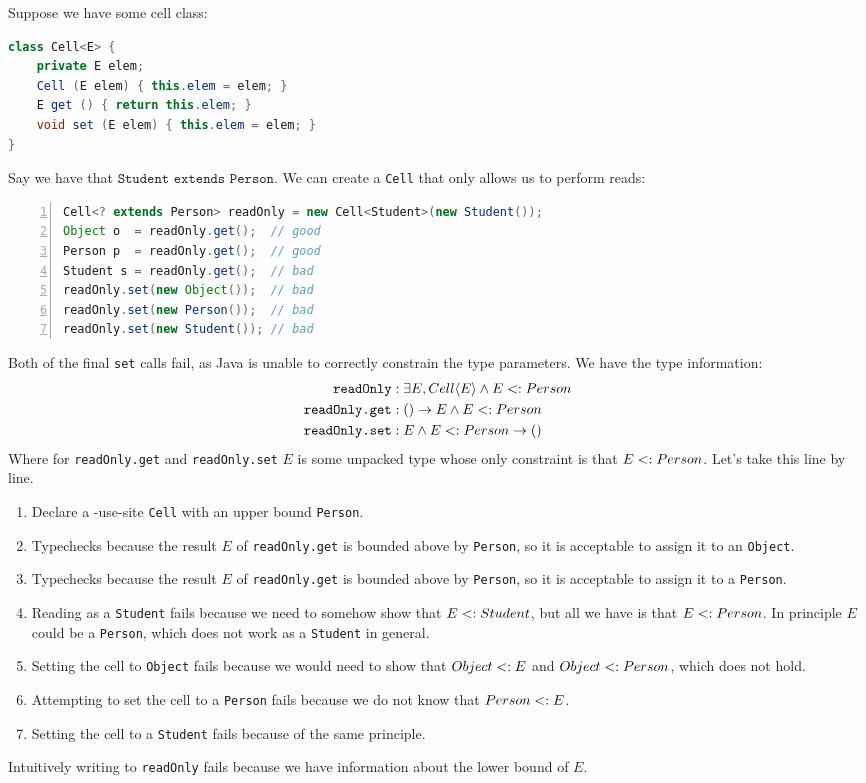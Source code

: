 \documentclass{article}
\begin{document}
\begin{example}
Suppose we have some cell class:
\begin{lstlisting}[escapechar=|, language=Java]
class Cell<E> {
    private E elem;
    Cell (E elem) { this.elem = elem; }
    E get () { return this.elem; }
    void set (E elem) { this.elem = elem; }
}
\end{lstlisting}
Say we have that $\texttt{Student extends Person}$.
We can create a \covar{} \texttt{Cell} that only allows us to perform reads:
\begin{lstlisting}[escapechar=|, language=Java, numbers=left]
Cell<? extends Person> readOnly = new Cell<Student>(new Student());
Object o  = readOnly.get();  // good
Person p  = readOnly.get();  // good
Student s = readOnly.get();  // bad
readOnly.set(new Object());  // bad
readOnly.set(new Person());  // bad
readOnly.set(new Student()); // bad
\end{lstlisting}
Both of the final \texttt{set} calls fail, as Java is unable to correctly constrain the type parameters.
We have the type information:
\begin{align*}
\texttt{readOnly} &: \exists E, Cell \langle E \rangle \wedge E <: Person \\
\texttt{readOnly.get} &: () \rightarrow E \wedge E <: Person \\
\texttt{readOnly.set} &: E \wedge E <: Person \rightarrow ()
\end{align*}
Where for \texttt{readOnly.get} and \texttt{readOnly.set} $E$ is some unpacked type whose only constraint is that $E <: Person$.
Let's take this line by line.
\begin{enumerate}
\item Declare a \covar{}-use-site \texttt{Cell} with an upper bound \texttt{Person}.
\item Typechecks because the result $E$ of \texttt{readOnly.get} is bounded above by \texttt{Person}, so it is acceptable to assign it to an \texttt{Object}.
\item  Typechecks because the result $E$ of \texttt{readOnly.get} is bounded above by \texttt{Person}, so it is acceptable to assign it to a \texttt{Person}.
\item Reading as a \texttt{Student} fails because we need to somehow show that $E <: Student$, but all we have is that $E <: Person$. In principle $E$ could be a \texttt{Person}, which does not work as a \texttt{Student} in general.
\item Setting the cell to \texttt{Object} fails because we would need to show that $Object <: E$ and $Object <: Person$, which does not hold.
\item Attempting to set the cell to a \texttt{Person} fails because we do not know that $Person <: E$.
\item Setting the cell to a \texttt{Student} fails because of the same principle.
\end{enumerate}
Intuitively writing to \texttt{readOnly} fails because we have information about the lower bound of $E$.


\end{example}
\end{document}
